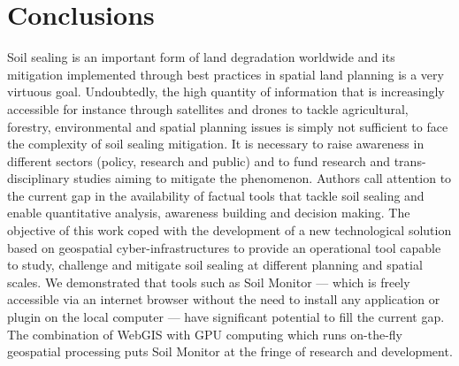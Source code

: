 \documentclass[APA,LATO1COL,doublespace]{WileyNJD-v2}
\begin{document}
\section{Conclusions}
Soil sealing is an important form of land degradation worldwide and its mitigation implemented through best practices in spatial land planning is a very virtuous goal.
Undoubtedly, the high quantity of information that is increasingly accessible for instance through satellites and drones to tackle agricultural, forestry, environmental and spatial planning issues is simply not sufficient to face the complexity of soil sealing mitigation.
It is necessary to raise awareness in different sectors (policy, research and public) and to fund research and trans-disciplinary studies aiming to mitigate the phenomenon.
Authors call attention to the current gap in the availability of factual tools that tackle soil sealing and enable quantitative analysis, awareness building and decision making. 
%
The objective of this work coped with the development of a new technological solution based on geospatial cyber-infrastructures to provide an operational tool capable to study, challenge and mitigate soil sealing at different planning and spatial scales.
%
We demonstrated that tools such as Soil Monitor --- which is freely accessible via an internet browser without the need to install any application or plugin on the local computer --- have significant potential to fill the current gap.
The combination of WebGIS with GPU computing which runs on-the-fly geospatial processing puts Soil Monitor at the fringe of research and development. 
\end{document}
